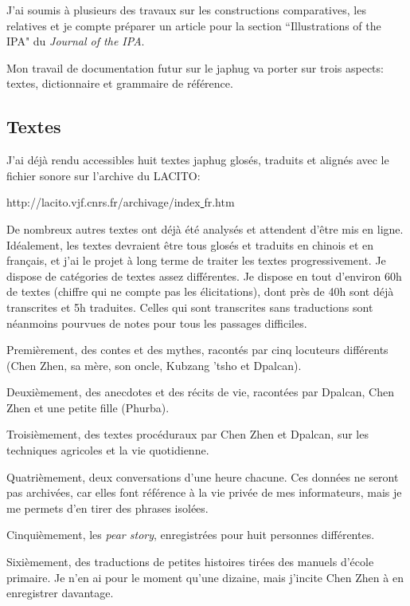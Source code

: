 \documentclass[oldfontcommands,oneside,a4paper,11pt]{memoir}
\begin{document}
	J'ai soumis à plusieurs des travaux sur les constructions comparatives, les relatives et je compte préparer un article pour la section ``Illustrations of the IPA" du \textit{Journal of the IPA}.
	
	Mon travail de documentation futur sur le japhug va porter sur trois aspects:  textes,  dictionnaire et grammaire de référence.
	
\subsection{Textes}
J’ai déjà rendu accessibles huit textes japhug glosés, traduits et alignés avec le fichier sonore sur l’archive du LACITO:
	
	{http://lacito.vjf.cnrs.fr/archivage/index{\underline{  }}fr.htm}
	
De nombreux autres textes ont déjà été analysés et attendent d’être mis en ligne. Idéalement, les textes devraient être tous glosés et traduits en chinois et en français, et j'ai le projet à long terme de traiter les textes progressivement. Je dispose de catégories de textes assez différentes. Je dispose en tout d'environ 60h de textes (chiffre qui ne compte pas les élicitations), dont près de 40h sont déjà transcrites et 5h traduites. Celles qui sont transcrites sans traductions sont néanmoins pourvues de notes pour tous les passages difficiles.


Premièrement, des contes et des mythes, racontés par cinq locuteurs différents (Chen Zhen, sa mère, son oncle, Kubzang 'tsho et Dpalcan).

Deuxièmement, des anecdotes et des récits de vie, racontées par Dpalcan, Chen Zhen et une petite fille (Phurba).

Troisièmement, des textes procéduraux par Chen Zhen et Dpalcan, sur les techniques agricoles et la vie quotidienne.

Quatrièmement, deux conversations d'une heure chacune. Ces données ne seront pas archivées, car elles font référence à la vie privée de mes informateurs, mais je me permets d'en tirer des phrases isolées.

Cinquièmement, les \textit{pear story}, enregistrées pour huit personnes différentes.  

Sixièmement, des traductions de petites histoires tirées des manuels d'école primaire. Je n'en ai pour le moment qu'une dizaine, mais j'incite Chen Zhen à en enregistrer davantage.
	
\end{document}
